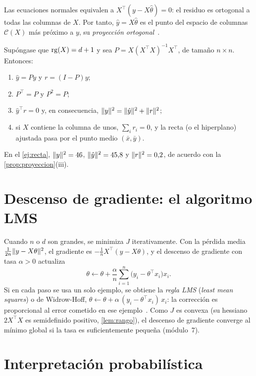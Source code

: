 Las ecuaciones normales equivalen a $X^{\top}(y-X\hat\theta)=0$: el residuo es ortogonal a todas las columnas de $X$. Por tanto, $\hat y=X\hat\theta$ es el punto del espacio de columnas $\mathcal{C}(X)$ más próximo a $y$, su \emph{proyección ortogonal}~\cite[§4.2--4.3]{strang}.

\begin{proposicion}\label{prop:proyeccion}
Supóngase que $\operatorname{rg}(X)=d+1$ y sea $P=X(X^{\top}X)^{-1}X^{\top}$, de tamaño $n\times n$. Entonces:
\begin{enumerate}
  \item $\hat y=Py$ y $r=(I-P)y$;
  \item $P^{\top}=P$ y $P^{2}=P$;
  \item $\hat y^{\top}r=0$ y, en consecuencia, $\lVert y\rVert^{2}=\lVert\hat y\rVert^{2}+\lVert r\rVert^{2}$;
  \item si $X$ contiene la columna de unos, $\sum_i r_i=0$, y la recta (o el hiperplano) ajustada pasa por el punto medio $(\bar x,\bar y)$.
\end{enumerate}
\end{proposicion}

\addtocounter{figure}{1}%

En el \cref{ej:recta}, $\lVert y\rVert^{2}=46$, $\lVert\hat y\rVert^{2}=45{,}8$ y $\lVert r\rVert^{2}=0{,}2$, de acuerdo con la \cref{prop:proyeccion}(iii).

\section{Descenso de gradiente: el algoritmo LMS}
\label{sec:lms}

Cuando $n$ o $d$ son grandes, se minimiza $J$ iterativamente. Con la pérdida media $\frac{1}{2n}\lVert y-X\theta\rVert^{2}$, el gradiente es $-\frac1n X^{\top}(y-X\theta)$, y el descenso de gradiente con tasa $\alpha>0$ actualiza
\[
\theta\leftarrow\theta+\frac{\alpha}{n}\sum_{i=1}^{n}\bigl(y_i-\theta^{\top}x_i\bigr)x_i.
\]
Si en cada paso se usa un solo ejemplo, se obtiene la \emph{regla LMS} (\emph{least mean squares}) o de Widrow-Hoff, $\theta\leftarrow\theta+\alpha\,(y_i-\theta^{\top}x_i)\,x_i$: la corrección es proporcional al error cometido en ese ejemplo~\cite[§1.1]{cs229}. Como $J$ es convexa (su hessiano $2X^{\top}X$ es semidefinido positivo, \cref{lem:rango}), el descenso de gradiente converge al mínimo global si la tasa es suficientemente pequeña (módulo~7).

\section{Interpretación probabilística}


